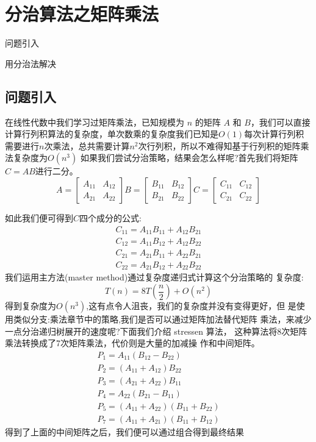 \chapter{分治算法之矩阵乘法}
\begin{introduction}
	\item 问题引入
	\item 用分治法解决
\end{introduction}
\section{问题引入}
在线性代数中我们学习过矩阵乘法，已知规模为 $n$ 的矩阵 $A$ 和 $B$，我们可以直接计算行列积算法的复杂度，单次数乘的复杂度我们已知是$ O(1)$每次计算行列积需要进行$n$次乘法，总共需要计算$n^2$次行列积，所以不难得知基于行列积的矩阵乘法复杂度为$O(n^3)$
如果我们尝试分治策略，结果会怎么样呢?首先我们将矩阵$C = AB$进行二分。
$$
A=\left[\begin{array}{ll}
A_{11} & A_{12} \\
A_{21} & A_{22}
\end{array}\right] B=\left[\begin{array}{ll}
B_{11} & B_{12} \\
B_{21} & B_{22}
\end{array}\right] C=\left[\begin{array}{ll}
C_{11} & C_{12} \\
C_{21} & C_{22}
\end{array}\right]
$$

如此我们便可得到$C$四个成分的公式:
$$
\begin{array}{l}
C_{11}=A_{11} B_{11}+A_{12} B_{21} \\
C_{12}=A_{11} B_{12}+A_{12} B_{22} \\
C_{21}=A_{21} B_{11}+A_{22} B_{21} \\
C_{22}=A_{21} B_{12}+A_{22} B_{22}
\end{array}
$$
我们运用主方法(master method)通过复杂度递归式计算这个分治策略的 复杂度:
$$
T(n)=8 T\left(\frac{n}{2}\right)+O\left(n^{2}\right)
$$
得到复杂度为$O(n^3)$,这有点令人沮丧，我们的复杂度并没有变得更好，但 是使用类似分支:乘法章节中的策略,我们是否可以通过矩阵加法替代矩阵 乘法，来减少一点分治递归树展开的速度呢?下面我们介绍 stressen 算法， 这种算法将8次矩阵乘法转换成了7次矩阵乘法，代价则是大量的加减操 作和中间矩阵。
$$
\begin{array}{c}
P_{1}=A_{11}\left(B_{12}-B_{22}\right) \\
P_{2}=\left(A_{11}+A_{12}\right) B_{22} \\
P_{3}=\left(A_{21}+A_{22}\right) B_{11} \\
P_{4}=A_{22}\left(B_{21}-B_{11}\right) \\
P_{5}=\left(A_{11}+A_{22}\right)\left(B_{11}+B_{22}\right) \\
P_{7}=\left(A_{11}+A_{21}\right)\left(B_{11}+B_{12}\right)
\end{array}
$$
得到了上面的中间矩阵之后，我们便可以通过组合得到最终结果
